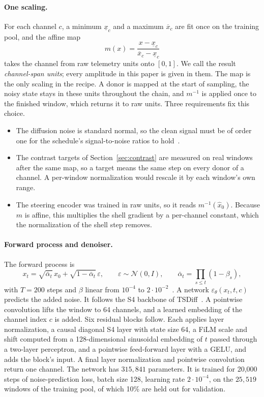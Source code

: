 \documentclass[11pt,a4paper]{article}
\newcommand{\xhat}{\hat{x}_{0}}            %
\newcommand{\abar}{\bar\alpha}
\newcommand{\lo}{\underline{x}}
\newcommand{\hi}{\overline{x}}
\begin{document}
\paragraph{One scaling.}
For each channel $c$, a minimum $\lo_{c}$ and a maximum $\hi_{c}$ are fit once
on the training pool, and the affine map
\begin{equation}
\label{eq:minmax}
m(x) = \frac{x - \lo_{c}}{\hi_{c} - \lo_{c}}
\end{equation}
takes the channel from raw telemetry units onto $[0, 1]$. We call the result
\emph{channel-span units}; every amplitude in this paper is given in them. The
map is the only scaling in the recipe. A donor is mapped at the start of
sampling, the noisy state stays in these units throughout the chain, and
$m^{-1}$ is applied once to the finished window, which returns it to raw
units. Three requirements fix this choice.
\begin{itemize}
\setlength{\itemsep}{1pt}
\item The diffusion noise is standard normal, so the clean signal must be of
  order one for the schedule's signal-to-noise ratios to
  hold~\cite{ho2020ddpm}.
\item The contrast targets of Section~\ref{sec:contrast} are measured on real
  windows after the same map, so a target means the same step on every donor
  of a channel. A per-window normalization would rescale it by each window's
  own range.
\item The steering encoder was trained in raw units, so it reads
  $m^{-1}(\xhat)$. Because $m$ is affine, this multiplies the shell gradient
  by a per-channel constant, which the normalization of the shell step
  removes.
\end{itemize}

\paragraph{Forward process and denoiser.}
The forward process is
\begin{equation}
\label{eq:forward}
x_{t} = \sqrt{\abar_{t}}\,x_{0} + \sqrt{1 - \abar_{t}}\,\varepsilon,
\qquad
\varepsilon \sim \mathcal{N}(0, I),
\qquad
\abar_{t} = \prod_{s \le t}(1 - \beta_{s}),
\end{equation}
with $T = 200$ steps and $\beta$ linear from $10^{-4}$ to
$2 \cdot 10^{-2}$~\cite{ho2020ddpm}. A network
$\varepsilon_{\theta}(x_{t}, t, c)$ predicts the added noise. It follows the
S4 backbone of TSDiff~\cite{kollovieh2023tsdiff,gu2022s4}. A pointwise
convolution lifts the window to 64 channels, and a learned embedding of the
channel index $c$ is added. Six residual blocks follow. Each applies layer
normalization, a causal diagonal S4 layer with state size 64, a FiLM scale and
shift computed from a 128-dimensional sinusoidal embedding of $t$ passed
through a two-layer perceptron, and a pointwise feed-forward layer with a
GELU, and adds the block's input. A final layer normalization and pointwise
convolution return one channel. The network has $315{,}841$ parameters. It is
trained for 20{,}000 steps of noise-prediction loss, batch size 128, learning
rate $2 \cdot 10^{-4}$, on the $25{,}519$ windows of the training pool, of
which 10\% are held out for validation.
\end{document}
